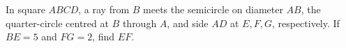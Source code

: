 In square $ABCD$, a ray from $B$ meets the semicircle on diameter $AB$, the quarter-circle centred at $B$ through $A$, and side $AD$ at $E,F,G$, respectively. If $BE=5$ and $FG=2$, find $EF$.
